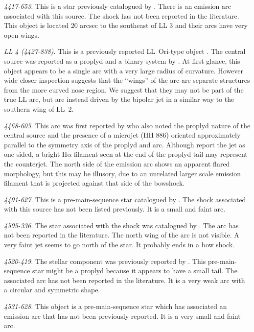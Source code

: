 \documentclass[apj, twocolumn]{aastex63}
\newcommand\ha{\ensuremath{\mathrm{H\alpha}}}
\begin{document}
\textit{4417-653.} This is a star previously catalogued by \citet{Hillenbrand:1997}.
There is an emission arc associated with this source. The shock has not been
reported in the literature. This object is located 20 arcsec to the southeast
of LL 3 and their arcs have very open wings.  

\textit{LL 4 (4427-838).} This is a previously reported LL~Ori-type
object \citep{Bally:2001a}. The central source was reported as a
proplyd and a binary system by \citet{Bally:2006a}. At first glance,
this object appears to be a single arc with a very large radius of
curvature. However wide closer inspection suggests that the ``wings''
of the arc are separate structures from the more curved nose
region. We suggest that they may not be part of the true LL arc, but
are instead driven by the bipolar jet \citep{Bally:2006a} in a similar
way to the southern wing of LL~2.

\textit{4468-605.}  This arc was first reported by \citet{Bally:2006a}
who also noted the proplyd nature of the central source and the
presence of a microjet (HH 886) oriented approximately parallel to the
symmetry axis of the proplyd and arc.  Although \citet{Bally:2006a}
report the jet as one-sided, a bright \ha{} filament seen at the end
of the proplyd tail may represent the counterjet.  The north side of
the emission arc shows an apparent flared morphology, but this may be
illusory, due to an unrelated larger scale emission filament that is
projected against that side of the bowshock.

\textit{4491-627.} This is a pre-main-sequence star catalogued by
\citet{Parihar:2009}. The shock associated with this source has not been
listed previously. It is a small and faint arc.

\textit{4505-336.} The star associated with the shock was catalogued
by \citet{Hillenbrand:1997}. The arc has not been reported in the
literature. The north wing of the arc is not visible. A very faint jet
seems to go north of the star. It probably ends in a bow shock.

\textit{4520-419.} The stellar component was previously reported
by \citet{Parihar:2009}. This pre-main-sequence star might be a proplyd
because it appears to have a small tail. The associated arc has not been
reported in the literature. It is a very weak arc with a circular and
symmetric shape.

\textit{4531-628.} This object is a pre-main-sequence star \citep{Da-Rio:2009a}
which has associated an emission arc that has not been previously reported.
It is a very small and faint arc.
\end{document}
